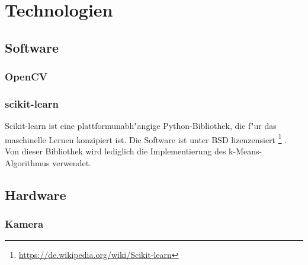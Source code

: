 \chapter{Technologien}
\label{cha:technologien}

\section{Software}
\label{sec:software}

\subsection{OpenCV}
\label{sec:opencv}

\subsection{scikit-learn}
\label{sec:scikitlearn}

Scikit-learn ist eine plattformunabh"angige Python-Bibliothek, die f"ur das maschinelle Lernen konzipiert ist. Die Software ist unter BSD lizenzensiert
\footnote{\url{https://de.wikipedia.org/wiki/Scikit-learn}}
.\newline
Von dieser Bibliothek wird lediglich die Implementierung des k-Means-Algorithmus verwendet.

\section{Hardware}
\label{sec:hardware}

\subsection{Kamera}
\label{sec:kamera}